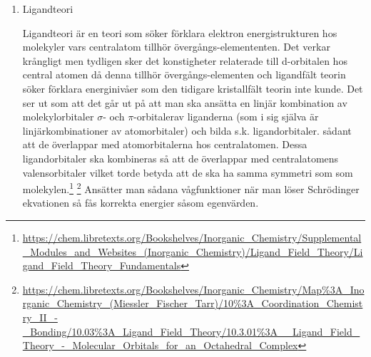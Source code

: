 \documentclass[./chem_exercises.tex]{subfiles}
\begin{document}
\begin{enumerate}
\item Ligandteori

Ligandteori är en teori som söker förklara elektron energistrukturen hos molekyler vars centralatom tillhör
övergångs-elemententen.
Det verkar krångligt men tydligen sker det konstigheter relaterade till d-orbitalen hos central atomen då denna tillhör
övergångs-elementen och ligandfält teorin söker förklara energinivåer som den tidigare kristallfält teorin inte kunde.
Det ser ut som att det går ut på att man ska ansätta en linjär kombination av molekylorbitaler $\sigma$- och $\pi$-orbitalerav liganderna
(som i sig själva är linjärkombinationer av atomorbitaler) och bilda s.k. ligandorbitaler.
sådant att de överlappar med atomorbitalerna hos centralatomen. Dessa ligandorbitaler
ska kombineras så att de överlappar med centralatomens valensorbitaler vilket torde betyda att de ska ha samma symmetri som som molekylen.\footnote[2]{\url{https://chem.libretexts.org/Bookshelves/Inorganic_Chemistry/Supplemental_Modules_and_Websites_(Inorganic_Chemistry)/Ligand_Field_Theory/Ligand_Field_Theory_Fundamentals}}
\footnote[3]{\url{https://chem.libretexts.org/Bookshelves/Inorganic_Chemistry/Map\%3A_Inorganic_Chemistry_(Miessler_Fischer_Tarr)/10\%3A_Coordination_Chemistry_II_-_Bonding/10.03\%3A_Ligand_Field_Theory/10.3.01\%3A__Ligand_Field_Theory_-_Molecular_Orbitals_for_an_Octahedral_Complex}}
Ansätter man sådana vågfunktioner när man löser Schrödinger ekvationen så fås korrekta energier såsom egenvärden.






\end{enumerate}








\end{document}
